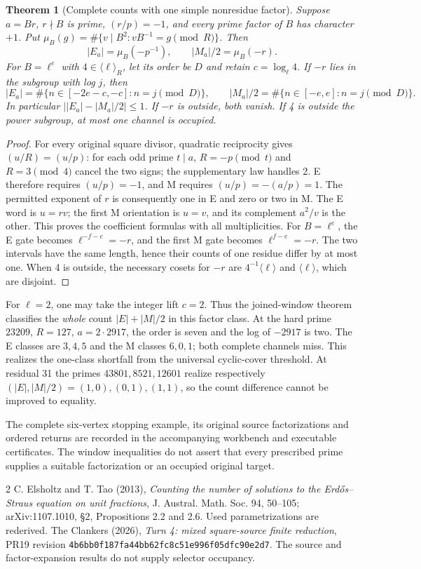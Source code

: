 \documentclass[11pt,reqno]{amsart}
\newtheorem{theorem}{Theorem}\newtheorem{proposition}[theorem]{Proposition}
\begin{document}
\begin{theorem}[Complete counts with one simple nonresidue factor]
Suppose $a=Br$, $r\nmid B$ is prime, $(r/p)=-1$, and every prime factor of $B$
has character $+1$. Put
$\mu_B(g)=\#\{v\mid B^2:vB^{-1}=g\pmod R\}$. Then
\[
 \boxed{|E_a|=\mu_B(-p^{-1}),\qquad |M_a|/2=\mu_B(-r).}
\]
For $B=\ell^e$ with $4\in\langle\ell\rangle_R$, let its order be $D$ and retain
$c=\log_\ell4$. If $-r$ lies in the subgroup with log $j$, then
\[
 |E_a|=\#\{n\in[-2e-c,-c]:n=j\pmod D\},\qquad
 |M_a|/2=\#\{n\in[-e,e]:n=j\pmod D\}.
\]
In particular $\bigl||E_a|-|M_a|/2\bigr|\le1$. If $-r$ is outside, both vanish.
If 4 is outside the power subgroup, at most one channel is occupied.
\end{theorem}
\begin{proof}
For every original square divisor, quadratic reciprocity gives $(u/R)=(u/p)$:
for each odd prime $t\mid a$, $R=-p\pmod t$ and $R=3\pmod4$ cancel the two
signs; the supplementary law handles 2. E therefore requires $(u/p)=-1$, and
M requires $(u/p)=-(a/p)=1$. The permitted exponent of $r$ is consequently one
in E and zero or two in M. The E word is $u=rv$; the first M orientation is
$u=v$, and its complement $a^2/v$ is the other. This proves the coefficient
formulas with all multiplicities. For $B=\ell^e$, the E gate becomes
$\ell^{-f-c}=-r$, and the first M gate becomes $\ell^{f-e}=-r$.
The two intervals have the same length, hence their counts of one residue
differ by at most one. When 4 is outside, the necessary cosets for $-r$ are
$4^{-1}\langle\ell\rangle$ and $\langle\ell\rangle$, which are disjoint.
\end{proof}
For $\ell=2$, one may take the integer lift $c=2$. Thus the joined-window theorem
classifies the \emph{whole} count $|E|+|M|/2$ in this factor class.
At the hard prime $23209$, $R=127$, $a=2\cdot2917$, the order is seven and the
log of $-2917$ is two. The E classes are $3,4,5$ and the M classes $6,0,1$;
both complete channels miss. This realizes the one-class shortfall from the
universal cyclic-cover threshold. At residual 31 the primes $43801,8521,12601$
realize respectively $(|E|,|M|/2)=(1,0),(0,1),(1,1)$, so the count difference
cannot be improved to equality.

The complete six-vertex stopping example, its original source factorizations and
ordered returns are recorded in the accompanying workbench and executable
certificates. The window inequalities do not assert that every prescribed prime
supplies a suitable factorization or an occupied original target.
\begin{thebibliography}{2}
 C. Elsholtz and T. Tao (2013), \emph{Counting the number of solutions to the
Erd\H{o}s--Straus equation on unit fractions}, J. Austral. Math. Soc. 94, 50--105;
arXiv:1107.1010, \S2, Propositions 2.2 and 2.6. Used parametrizations are rederived.
 The Clankers (2026), \emph{Turn 4: mixed square-source finite reduction},
PR19 revision \texttt{4b6bb0f187fa44bb62fc8c51e996f05dfc90e2d7}.
The source and factor-expansion results do not supply selector occupancy.
\end{thebibliography}
\end{document}
